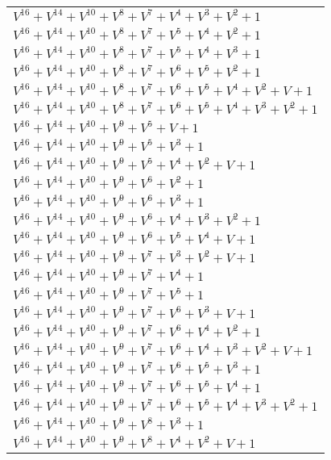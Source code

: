 \documentclass[12pt]{article}
\begin{document}
\begin{adjustwidth}{-4cm}{}
\begin{center}
\begin{longtable}{|l|}
$V^{16}  +V^{14}  +V^{10}  +V^{8}  +V^{7}  +V^{4}  +V^{3}  +V^{2}  + 1$ \\
$V^{16}  +V^{14}  +V^{10}  +V^{8}  +V^{7}  +V^{5}  +V^{4}  +V^{2}  + 1$ \\
$V^{16}  +V^{14}  +V^{10}  +V^{8}  +V^{7}  +V^{5}  +V^{4}  +V^{3}  + 1$ \\
$V^{16}  +V^{14}  +V^{10}  +V^{8}  +V^{7}  +V^{6}  +V^{5}  +V^{2}  + 1$ \\
$V^{16}  +V^{14}  +V^{10}  +V^{8}  +V^{7}  +V^{6}  +V^{5}  +V^{4}  +V^{2}  + V + 1$ \\
$V^{16}  +V^{14}  +V^{10}  +V^{8}  +V^{7}  +V^{6}  +V^{5}  +V^{4}  +V^{3}  +V^{2}  + 1$ \\
$V^{16}  +V^{14}  +V^{10}  +V^{9}  +V^{5}  + V + 1$ \\
$V^{16}  +V^{14}  +V^{10}  +V^{9}  +V^{5}  +V^{3}  + 1$ \\
$V^{16}  +V^{14}  +V^{10}  +V^{9}  +V^{5}  +V^{4}  +V^{2}  + V + 1$ \\
$V^{16}  +V^{14}  +V^{10}  +V^{9}  +V^{6}  +V^{2}  + 1$ \\
$V^{16}  +V^{14}  +V^{10}  +V^{9}  +V^{6}  +V^{3}  + 1$ \\
$V^{16}  +V^{14}  +V^{10}  +V^{9}  +V^{6}  +V^{4}  +V^{3}  +V^{2}  + 1$ \\
$V^{16}  +V^{14}  +V^{10}  +V^{9}  +V^{6}  +V^{5}  +V^{4}  + V + 1$ \\
$V^{16}  +V^{14}  +V^{10}  +V^{9}  +V^{7}  +V^{3}  +V^{2}  + V + 1$ \\
$V^{16}  +V^{14}  +V^{10}  +V^{9}  +V^{7}  +V^{4}  + 1$ \\
$V^{16}  +V^{14}  +V^{10}  +V^{9}  +V^{7}  +V^{5}  + 1$ \\
$V^{16}  +V^{14}  +V^{10}  +V^{9}  +V^{7}  +V^{6}  +V^{3}  + V + 1$ \\
$V^{16}  +V^{14}  +V^{10}  +V^{9}  +V^{7}  +V^{6}  +V^{4}  +V^{2}  + 1$ \\
$V^{16}  +V^{14}  +V^{10}  +V^{9}  +V^{7}  +V^{6}  +V^{4}  +V^{3}  +V^{2}  + V + 1$ \\
$V^{16}  +V^{14}  +V^{10}  +V^{9}  +V^{7}  +V^{6}  +V^{5}  +V^{3}  + 1$ \\
$V^{16}  +V^{14}  +V^{10}  +V^{9}  +V^{7}  +V^{6}  +V^{5}  +V^{4}  + 1$ \\
$V^{16}  +V^{14}  +V^{10}  +V^{9}  +V^{7}  +V^{6}  +V^{5}  +V^{4}  +V^{3}  +V^{2}  + 1$ \\
$V^{16}  +V^{14}  +V^{10}  +V^{9}  +V^{8}  +V^{3}  + 1$ \\
$V^{16}  +V^{14}  +V^{10}  +V^{9}  +V^{8}  +V^{4}  +V^{2}  + V + 1$ \\

\end{longtable}
\end{center}
\end{adjustwidth}
\end{document}
